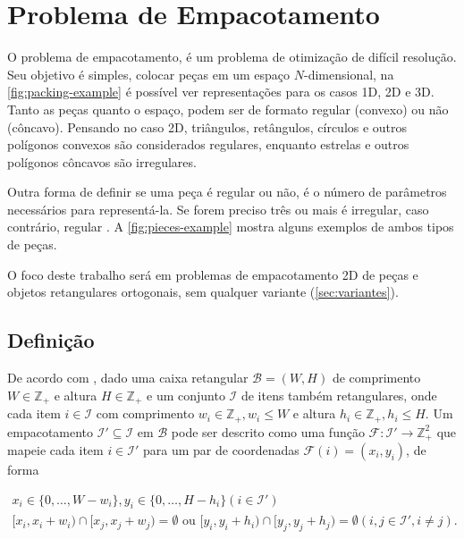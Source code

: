 \chapter{Problema de Empacotamento}\label{ch:problema-de-empacotamento}

O problema de empacotamento, é um problema de otimização de difícil resolução.
Seu objetivo é simples, colocar peças em um espaço $N$-dimensional, na \autoref{fig:packing-example} é possível ver representações para os casos 1D, 2D e 3D.
Tanto as peças quanto o espaço, podem ser de formato regular (convexo) ou não (côncavo).
Pensando no caso 2D, triângulos, retângulos, círculos e outros polígonos convexos são considerados regulares, enquanto estrelas e outros polígonos côncavos são irregulares.



Outra forma de definir se uma peça é regular ou não, é o número de parâmetros necessários para representá-la.
Se forem preciso três ou mais é irregular, caso contrário, regular \cite{aprendizado-reforco}.
A \autoref{fig:pieces-example} mostra alguns exemplos de ambos tipos de peças.

O foco deste trabalho será em problemas de empacotamento 2D de peças e objetos retangulares ortogonais, sem qualquer variante (\autoref{sec:variantes}).




\section{Definição}\label{sec:definicao}

De acordo com \cite{2DPackLib}, dado uma caixa retangular $\mathcal{B} = (W, H)$ de comprimento $W \in \mathbb{Z}_+$ e altura $H \in \mathbb{Z}_+$ e um conjunto $\mathcal{I}$ de itens também retangulares, onde cada item $i \in \mathcal{I}$ com comprimento $w_i \in \mathbb{Z}_+, w_i \le W$ e altura $h_i \in \mathbb{Z}_+, h_i \le H$.
Um empacotamento $\mathcal{I}' \subseteq \mathcal{I}$ em $\mathcal{B}$ pode ser descrito como uma função $\mathcal{F}: \mathcal{I}' \to \mathbb{Z}_+^2$ que mapeie cada item $i \in \mathcal{I}'$ para um par de coordenadas $\mathcal{F}(i) = (x_i, y_i)$, de forma

\begin{align}
    x_i \in \{0, \dots, W - w_i\}, y_i \in \{0, \dots, H - h_i\} (i \in \mathcal{I}') \label{eq:1} \\
    [x_i, x_i + w_i) \cap [x_j, x_j + w_j) = \emptyset \text{ ou } [y_i, y_i + h_i) \cap [y_j, y_j + h_j) = \emptyset (i, j \in \mathcal{I}', i \neq j) \label{eq:2}.
\end{align}

